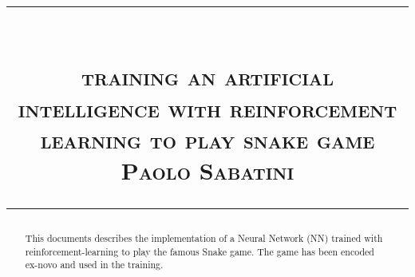 \documentclass{article}
\title{
\begin{flushleft}
\rule{\textwidth}{1pt}\\
  \textsc{\textbf{training an artificial intelligence with reinforcement learning to play snake game}}\\[2mm]
\textsc{\large Paolo Sabatini}\\
\rule{\textwidth}{1pt}
  \end{flushleft}
}
\date{}
\begin{document}
\maketitle


\begin{abstract}

  This documents describes the implementation of a Neural Network (NN) trained with reinforcement-learning to play the famous Snake game. The game has been encoded ex-novo and used in the training.
  
\end{abstract}
\vspace{2cm}
\tableofcontents

\newpage




\newpage
\end{document}

